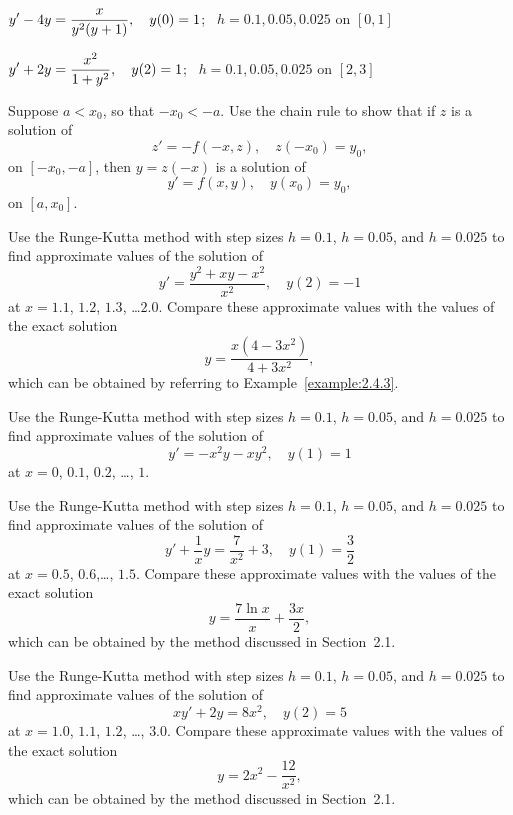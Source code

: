 \begin{exerciselist}
  \item\label{exer:3.3.21} \Cex $\displaystyle{y'-4y=\frac{x}{y^{2}(y+1)},\quad y(0)=1}$; \,
        $h=0.1,0.05,0.025$ on $[0,1]$

  \item\label{exer:3.3.22} \Cex $\displaystyle{y'+2y=\frac{x^{2}}{1+y^{2}},\quad y(2)=1}$; \,
        $h=0.1,0.05,0.025$ on $[2,3]$

  \item\label{exer:3.3.23} \Cex Suppose $a<x_{0}$, so that $-x_{0}<-a$. Use the chain rule to show
        that if $z$ is a solution of
  \[
    z'=-f(-x,z),\quad z(-x_{0})=y_{0},
  \]
  on $[-x_{0},-a]$, then $y=z(-x)$ is a solution of
  \[
    y'=f(x,y),\quad y(x_{0})=y_{0},
  \]
  on $[a,x_{0}]$.

  \item\label{exer:3.3.24} \Cex Use the Runge-Kutta method with step sizes $h=0.1$, $h=0.05$, and
        $h=0.025$ to find approximate values of the solution of
  \[
    y'=\frac{y^{2}+xy-x^{2}}{x^{2}},\quad y(2)=-1
  \]
  at $x=1.1$, $1.2$, $1.3$, \dots $2.0$. Compare these approximate values with the values of the
  exact solution
  \[
    y=\frac{x(4-3x^{2})}{4+3x^{2}},
  \]
  which can be obtained by referring to Example~\ref{example:2.4.3}.

  \item\label{exer:3.3.25} \Cex Use the Runge-Kutta method with step sizes $h=0.1$, $h=0.05$, and
        $h=0.025$ to find approximate values of the solution of
  \[
    y'=-x^{2}y-xy^{2},\quad y(1)=1
  \]
  at $x=0$, $0.1$, $0.2$, \dots, $1$.

  \item\label{exer:3.3.26} \Cex Use the Runge-Kutta method with step sizes $h=0.1$, $h=0.05$, and
        $h=0.025$ to find approximate values of the solution of
  \[
    y'+\frac{1}{x}y=\frac{7}{x^{2}}+3,\quad y(1)=\frac{3}{2}
  \]
  at $x=0.5$, $0.6$,\dots, $1.5$. Compare these approximate values with the values of the exact
  solution
  \[
    y=\frac{7\ln x}{x}+\frac{3x}{2},
  \]
  which can be obtained by the method discussed in Section~2.1.

  \item\label{exer:3.3.27} \Cex Use the Runge-Kutta method with step sizes $h=0.1$, $h=0.05$, and
        $h=0.025$ to find approximate values of the solution of
  \[
    xy'+2y=8x^{2},\quad y(2)=5
  \]
  at $x=1.0$, $1.1$, $1.2$, \dots, $3.0$. Compare these approximate values with the values of the
  exact solution
  \[
    y=2x^{2}-\frac{12}{x^{2}},
  \]
  which can be obtained by the method discussed in Section~2.1.


\end{exerciselist}
